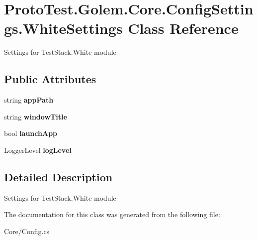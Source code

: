 \hypertarget{class_proto_test_1_1_golem_1_1_core_1_1_config_settings_1_1_white_settings}{\section{Proto\-Test.\-Golem.\-Core.\-Config\-Settings.\-White\-Settings Class Reference}
\label{class_proto_test_1_1_golem_1_1_core_1_1_config_settings_1_1_white_settings}
}


Settings for Test\-Stack.\-White module  


\subsection*{Public Attributes}
\begin{DoxyCompactItemize}
\item 
\hypertarget{class_proto_test_1_1_golem_1_1_core_1_1_config_settings_1_1_white_settings_ae0f4c56055233c6826ca4deb21c2bf9f}{string {\bfseries app\-Path}}\label{class_proto_test_1_1_golem_1_1_core_1_1_config_settings_1_1_white_settings_ae0f4c56055233c6826ca4deb21c2bf9f}

\item 
\hypertarget{class_proto_test_1_1_golem_1_1_core_1_1_config_settings_1_1_white_settings_afbfc20c9b84212c338727498aeb2c2c5}{string {\bfseries window\-Title}}\label{class_proto_test_1_1_golem_1_1_core_1_1_config_settings_1_1_white_settings_afbfc20c9b84212c338727498aeb2c2c5}

\item 
\hypertarget{class_proto_test_1_1_golem_1_1_core_1_1_config_settings_1_1_white_settings_afb47dba731dce8063c6b5ceec4682083}{bool {\bfseries launch\-App}}\label{class_proto_test_1_1_golem_1_1_core_1_1_config_settings_1_1_white_settings_afb47dba731dce8063c6b5ceec4682083}

\item 
\hypertarget{class_proto_test_1_1_golem_1_1_core_1_1_config_settings_1_1_white_settings_ae51b337370d4966bf614ce7e025f5229}{Logger\-Level {\bfseries log\-Level}}\label{class_proto_test_1_1_golem_1_1_core_1_1_config_settings_1_1_white_settings_ae51b337370d4966bf614ce7e025f5229}

\end{DoxyCompactItemize}


\subsection{Detailed Description}
Settings for Test\-Stack.\-White module 



The documentation for this class was generated from the following file\-:\begin{DoxyCompactItemize}
\item 
Core/Config.\-cs\end{DoxyCompactItemize}
